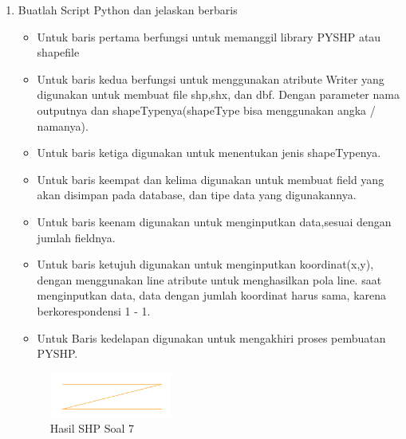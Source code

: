 \begin{enumerate}
	\item Buatlah Script Python dan jelaskan berbaris
	
	\begin{itemize}
		\item Untuk baris pertama berfungsi untuk memanggil library PYSHP atau shapefile
		\item Untuk baris kedua berfungsi untuk menggunakan atribute Writer yang digunakan untuk membuat file shp,shx, dan dbf. \hfill\break Dengan parameter nama outputnya dan shapeTypenya(shapeType bisa menggunakan angka / namanya).
		\item Untuk baris ketiga digunakan untuk menentukan jenis shapeTypenya.
		\item Untuk baris keempat dan kelima digunakan untuk membuat field yang akan disimpan pada database, dan tipe data yang digunakannya.
		\item Untuk baris keenam digunakan untuk menginputkan data,sesuai dengan jumlah fieldnya.
		\item Untuk baris ketujuh digunakan untuk menginputkan koordinat(x,y), dengan menggunakan line atribute untuk menghasilkan pola line. \hfill\break
		saat menginputkan data, data dengan jumlah koordinat harus sama, karena berkorespondensi 1 - 1.
		\item Untuk Baris kedelapan digunakan untuk mengakhiri proses pembuatan PYSHP.
	\end{itemize}
	\hfill\break
	\begin{figure}[H]
		\includegraphics[width=4cm]{figures/1174004/2/7.png}
		\centering
		\caption{Hasil SHP Soal 7}
	\end{figure}


\end{enumerate}
